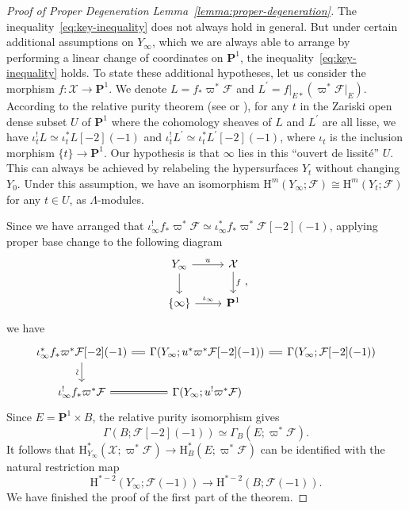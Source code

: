 \documentclass[english]{smfart}
\renewcommand{\mathbb}{\mathbf}
\theoremstyle{remark}
\theoremstyle{plain}
\theoremstyle{definition}
\numberwithin{equation}{remark}
\theoremstyle{void}
\begin{document}
\begin{proof}[Proof of Proper Degeneration Lemma~\ref{lemma:proper-degeneration}]
The inequality~\eqref{eq:key-inequality} does not always hold in
general.  But under certain additional assumptions on \(Y_{\infty}\),
which we are always able to arrange by performing a linear change of
coordinates on \(\mathbb{P}^1\), the
inequality~\eqref{eq:key-inequality} holds.  To state these additional
hypotheses, let us consider the morphism
\(f\colon \mathcal{X} \to \mathbb{P}^1\).  We denote
\(L = f_{\ast}\varpi^{\ast}\mathcal{F}\) and
\(L^{\prime} = f|_{E\ast}(\varpi^{\ast}\mathcal{F}|_{E})\).  According
to the relative purity theorem (see \cite[Exposé XVI, 3.3]{sga4} or
\cite[Theorem~11.2,~Supplement]{kiehl-weissauer_weil-conjectures-perverse-sheaves}),
for any \(t\) in the Zariski open dense subset \(U\) of
\(\mathbb{P}^1\) where the cohomology sheaves of \(L\) and
\(L^{\prime}\) are all lisse, we have
\(\iota_t^{!}L \simeq \iota_{t}^{\ast}L[-2](-1)\) and
\(\iota_t^{!}L^{\prime} \simeq \iota_t^{\ast}L^{\prime}[-2](-1)\),
where \(\iota_t\) is the inclusion morphism
\(\{t\} \to \mathbb{P}^1\).  Our hypothesis is that \(\infty\) lies in
this ``ouvert de lissité'' \(U\).  This can always be achieved by
relabeling the hypersurfaces \(Y_t\) without changing \(Y_0\).  Under
this assumption, we have an isomorphism
\(\mathrm{H}^{m}(Y_{\infty};\mathcal{F})\cong\mathrm{H}^{m}(Y_{t};\mathcal{F})\)
for any \(t \in U\), as \(\Lambda\)-modules.

Since we have arranged that
\(\iota_{\infty}^{!}f_{\ast}\varpi^{\ast}\mathcal{F}\simeq\iota_{\infty}^{\ast}f_{\ast}\varpi^{\ast}\mathcal{F}[-2](-1)\),
applying proper base change to the following diagram
\begin{equation*}
\begin{tikzcd}
Y_{\infty}\ar[r,"u"] \ar[d] & \mathcal{X} \ar[d,"f"] \\ \{\infty\}\ar[r,"\iota_{\infty}"] & \mathbb{P}^1
\end{tikzcd},
\end{equation*}
we have
\begin{equation*}
\begin{tikzcd}[column sep=small]
\iota_{\infty}^{\ast}f_{\ast}\varpi^{\ast}\mathcal{F}[-2](-1) \ar[d,"\sim" {anchor=south, rotate=90}] \ar[r,equal] &
\Gamma(Y_{\infty};u^{\ast}\varpi^{\ast}\mathcal{F}[-2](-1)) \ar[r,equal] & \Gamma(Y_{\infty};\mathcal{F}[-2](-1)) \\
\iota_{\infty}^{!}f_{\ast}\varpi^{\ast}\mathcal{F} \ar[r,equal] &
\Gamma(Y_{\infty};u^{!}\varpi^{\ast}\mathcal{F})
\end{tikzcd}
\end{equation*}
Since \(E = \mathbb{P}^{1} \times B\), the relative purity isomorphism gives
\begin{equation*}
\Gamma(B;\mathcal{F}[-2](-1)) \simeq \Gamma_{B}(E;\varpi^{\ast}\mathcal{F}).
\end{equation*}
It follows that
\(\mathrm{H}^{\ast}_{Y_{\infty}}(\mathcal{X};\varpi^{\ast}\mathcal{F})\to\mathrm{H}_B^{\ast}(E;\varpi^{\ast}\mathcal{F})\)
can be identified with the natural restriction map
\[\mathrm{H}^{\ast-2}(Y_{\infty};\mathcal{F}(-1)) \to \mathrm{H}^{\ast-2}(B;\mathcal{F}(-1)).\]
We have finished the proof of the first part of the theorem.


\end{proof}
\end{document}
